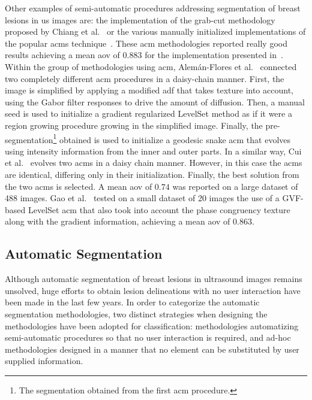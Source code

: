 \documentclass[authoryear,preprint,review,12pt]{elsarticle}
\begin{document}
Other examples of semi-automatic procedures addressing segmentation of breast lesions in \ac{us} images are: the implementation of the grab-cut methodology proposed by Chiang et al.~\cite{chiang2010cell} or the various manually initialized implementations of the popular \acp{acm} technique~\cite{AlemanFlores:2007p14310,Cui:2009p14325,Gao:2012p14336}. These \ac{acm} methodologies reported really good results achieving a mean \ac{aov} of $0.883$ for the implementation presented in~\cite{AlemanFlores:2007p14310}. Within the group of methodologies using \ac{acm},  Alem{\'a}n-Flores et al.~\cite{AlemanFlores:2007p14310} connected two completely different \ac{acm} procedures in a daisy-chain manner. First, the image is simplified by applying a modified \ac{adf} that takes texture into account, using the Gabor filter responses to drive the amount of diffusion. Then, a manual seed is used to initialize a gradient regularized LevelSet method as if it were a region growing procedure growing in the simplified image. Finally, the pre-segmentation\footnote{The segmentation obtained from the first \ac{acm} procedure.} obtained is used to initialize a geodesic snake \ac{acm} that evolves using intensity information from the inner and outer parts.
In a similar way, Cui et al.~\cite{Cui:2009p14325} evolves two \acp{acm} in a daisy chain manner. However, in this case the \acp{acm} are identical, differing only in their initialization. Finally, the best solution from the two \acp{acm} is selected. A mean \ac{aov} of $0.74$ was reported on a large dataset of 488 images. Gao et al.~\cite{Gao:2012p14336} tested on a small dataset of 20 images the use of a GVF-based LevelSet \ac{acm} that also took into account the phase congruency texture~\cite{kovesi2000phase} along with the gradient information, achieving a mean \ac{aov} of $0.863$.


\subsection{Automatic Segmentation}
Although automatic segmentation of breast lesions in ultrasound images remains unsolved, huge efforts 
to obtain lesion delineations with no user interaction have been made in the last few years. In order to categorize the automatic segmentation methodologies, two distinct strategies when designing the methodologies have been adopted for classification: methodologies automatizing semi-automatic procedures so that no user interaction is required, and ad-hoc methodologies designed in a manner that no element can be substituted by user supplied information. 
\end{document}
